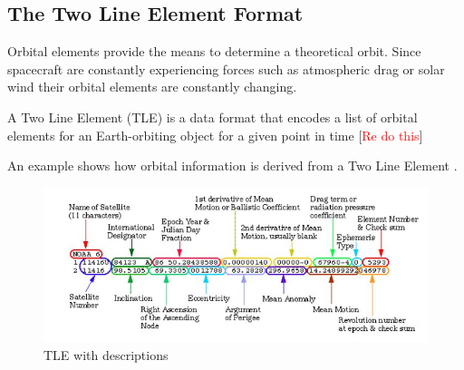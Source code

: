 \documentclass[12pt]{article}
\begin{document}
	
	
	
	\subsection{The Two Line Element Format}
	
	Orbital elements provide the means to determine a theoretical orbit. Since spacecraft are constantly experiencing forces such as atmospheric drag or solar wind their orbital elements are constantly changing. \par 
	A Two Line Element (TLE) is a data format that encodes a list of orbital elements for an Earth-orbiting object for a given point in time [\textcolor{red}{Re do this}]\par
	
	An example shows how orbital information is derived from a Two Line Element \cite{NASATLE}.
	\begin{figure}[h!]
		\centering
		\includegraphics[width=0.7\linewidth]{tle_nasa}
		\caption{TLE with descriptions}
		\label{fig:tlenasa}
	\end{figure}
	
\end{document}
